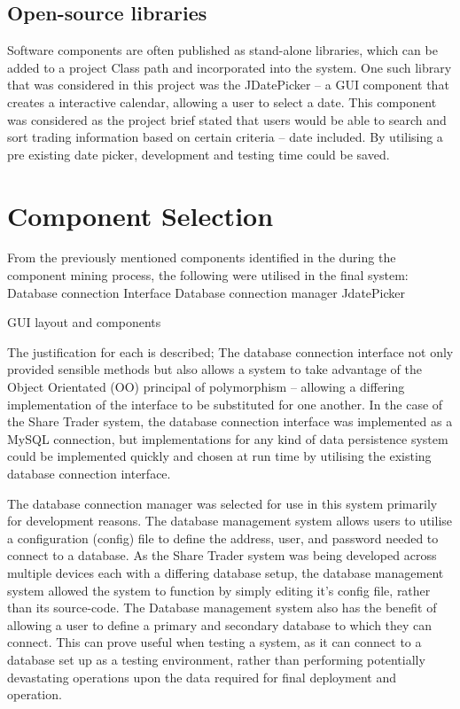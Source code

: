 \documentclass[12pt, a4paper,titlepage]{article}
\begin{document}
\subsection{Open-source libraries}
Software components are often published as stand-alone libraries, which can be
added to a project Class path and incorporated into the system. One such
library that was considered in this project was the JDatePicker – a GUI
component that creates a interactive calendar, allowing a user to select a
date. This component was considered as the project brief stated that users
would be able to search and sort trading information based on certain criteria
– date included. By utilising a pre existing date picker, development and
testing time could be saved.

\section{Component Selection}
From the previously mentioned components identified in the during the
component mining process, the following were utilised in the final system:
Database connection Interface
Database connection manager
JdatePicker


GUI layout and components

The justification for each is described;
The database connection interface not only provided sensible methods but also
allows a system to take advantage of the Object Orientated (OO) principal of
polymorphism – allowing a differing implementation of the interface to be
substituted for one another. In the case of the Share Trader system, the
database connection interface was implemented as a MySQL connection, but
implementations for any kind of data persistence system could be implemented
quickly and chosen at run time by utilising the existing database connection
interface.

The database connection manager was selected for use in this system primarily
for development reasons. The database management system allows users to
utilise a configuration (config) file to define the address, user, and
password needed to connect to a database. As the Share Trader system was
being developed across multiple devices each with a differing database
setup, the database management system allowed the system to function by
simply editing it’s config file, rather than its source-code.  The
Database management system also has the benefit of allowing a user to
define a primary and secondary database to which they can connect. This
can prove useful when testing a system, as it can connect to a database
set up as a testing environment, rather than performing potentially
devastating operations upon the data required for final deployment and
operation.
\end{document}
